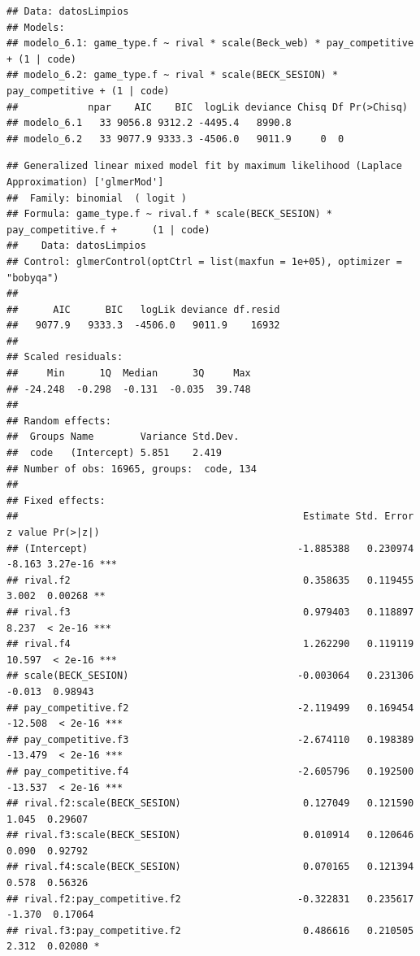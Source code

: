 \documentclass[
]{article}
\begin{document}
\begin{verbatim}
## Data: datosLimpios
## Models:
## modelo_6.1: game_type.f ~ rival * scale(Beck_web) * pay_competitive + (1 | code)
## modelo_6.2: game_type.f ~ rival * scale(BECK_SESION) * pay_competitive + (1 | code)
##            npar    AIC    BIC  logLik deviance Chisq Df Pr(>Chisq)
## modelo_6.1   33 9056.8 9312.2 -4495.4   8990.8                    
## modelo_6.2   33 9077.9 9333.3 -4506.0   9011.9     0  0
\end{verbatim}

\begin{verbatim}
## Generalized linear mixed model fit by maximum likelihood (Laplace Approximation) ['glmerMod']
##  Family: binomial  ( logit )
## Formula: game_type.f ~ rival.f * scale(BECK_SESION) * pay_competitive.f +      (1 | code)
##    Data: datosLimpios
## Control: glmerControl(optCtrl = list(maxfun = 1e+05), optimizer = "bobyqa")
## 
##      AIC      BIC   logLik deviance df.resid 
##   9077.9   9333.3  -4506.0   9011.9    16932 
## 
## Scaled residuals: 
##     Min      1Q  Median      3Q     Max 
## -24.248  -0.298  -0.131  -0.035  39.748 
## 
## Random effects:
##  Groups Name        Variance Std.Dev.
##  code   (Intercept) 5.851    2.419   
## Number of obs: 16965, groups:  code, 134
## 
## Fixed effects:
##                                                 Estimate Std. Error z value Pr(>|z|)    
## (Intercept)                                    -1.885388   0.230974  -8.163 3.27e-16 ***
## rival.f2                                        0.358635   0.119455   3.002  0.00268 ** 
## rival.f3                                        0.979403   0.118897   8.237  < 2e-16 ***
## rival.f4                                        1.262290   0.119119  10.597  < 2e-16 ***
## scale(BECK_SESION)                             -0.003064   0.231306  -0.013  0.98943    
## pay_competitive.f2                             -2.119499   0.169454 -12.508  < 2e-16 ***
## pay_competitive.f3                             -2.674110   0.198389 -13.479  < 2e-16 ***
## pay_competitive.f4                             -2.605796   0.192500 -13.537  < 2e-16 ***
## rival.f2:scale(BECK_SESION)                     0.127049   0.121590   1.045  0.29607    
## rival.f3:scale(BECK_SESION)                     0.010914   0.120646   0.090  0.92792    
## rival.f4:scale(BECK_SESION)                     0.070165   0.121394   0.578  0.56326    
## rival.f2:pay_competitive.f2                    -0.322831   0.235617  -1.370  0.17064    
## rival.f3:pay_competitive.f2                     0.486616   0.210505   2.312  0.02080 *  

\end{verbatim}
\end{document}
